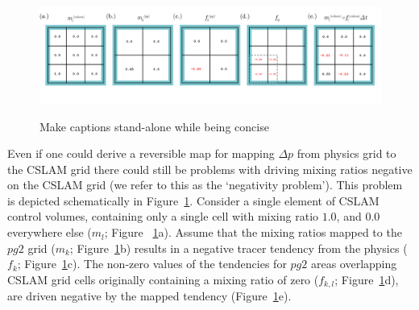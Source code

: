 \begin{itemize}
\begin{figure}[t]
\begin{center}
\noindent\includegraphics[width=30pc,angle=0]{figs/alg-schematic.png}\\
\end{center}
\caption{Make captions stand-alone while being concise}
\label{fig:alg-schematic}
\end{figure}

Even if one could derive a reversible map for mapping $\Delta p$ from physics grid to the CSLAM grid there could still be problems with driving mixing ratios negative on the CSLAM grid (we refer to this as the `negativity problem'). This problem is depicted schematically in Figure~\ref{fig:alg-schematic}. Consider a single element of CSLAM control volumes, containing only a single cell with mixing ratio $1.0$, and $0.0$ everywhere else ($m_l$; Figure ~\ref{fig:alg-schematic}a). Assume that the mixing ratios mapped to the $pg2$ grid ($m_k$; Figure~\ref{fig:alg-schematic}b) results in a negative tracer tendency from the physics ($f_k$; Figure~\ref{fig:alg-schematic}c). The non-zero values of the tendencies for $pg2$ areas overlapping CSLAM grid cells originally containing a mixing ratio of zero ($f_{k,l}$; Figure~\ref{fig:alg-schematic}d), are driven negative by the mapped tendency (Figure~\ref{fig:alg-schematic}e). 



\end{itemize}
